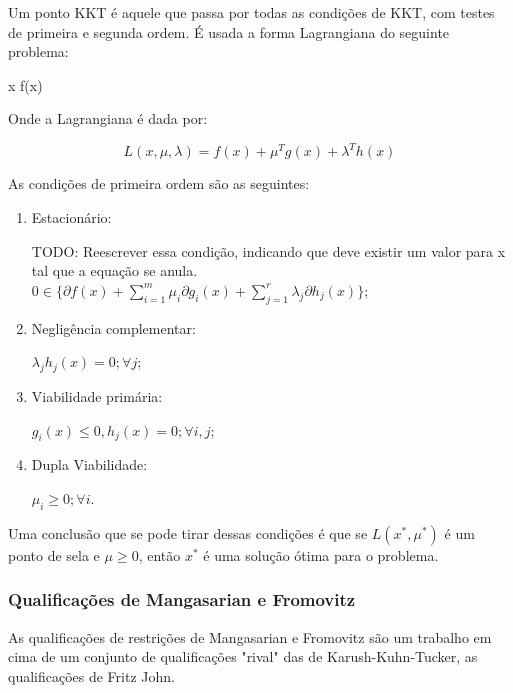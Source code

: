 Um ponto KKT é aquele que passa por todas as condições de KKT, com testes de primeira e segunda
ordem. É usada a forma Lagrangiana do seguinte problema:


\vspace{-15pt}
\begin{mini!}
{x}{ f(x) \label{kkt_obj}}{\label{prob_kkt}}{}
\end{mini!}

Onde a Lagrangiana é dada por:

\begin{equation}
  L(x, \mu, \lambda) = f(x) + \mu^T g(x) + \lambda^T h(x)
\end{equation}

As condições de primeira ordem são as seguintes:

\begin{enumerate}

\item Estacionário:

  TODO: Reescrever essa condição, indicando que deve existir um valor para x tal que a equação se anula.
  \( 0 \in \{ \partial f(x) + \sum_{i=1}^m \mu_i \partial g_i(x) + \sum_{j=1}^r \lambda_j \partial h_j(x)\} \);

\item Negligência complementar:

  \( \lambda_j h_j(x) = 0; \forall j \);
  
\item Viabilidade primária:

  \( g_i(x) \leq 0, h_j(x) = 0; \forall i, j \);
  
\item Dupla Viabilidade:

  \( \mu_i \geq 0; \forall i \).

\end{enumerate}

Uma conclusão que se pode tirar dessas condições é que se \( L(x^{*}, \mu^{*}) \) é um ponto de sela e
\( \mu \geq 0 \), então \( x^{*} \) é uma solução ótima para o problema.

\subsubsection{Qualificações de Mangasarian e Fromovitz}
As qualificações de restrições de Mangasarian e Fromovitz são um trabalho
em cima de um conjunto de qualificações "rival" das de Karush-Kuhn-Tucker,
as qualificações de Fritz John.

